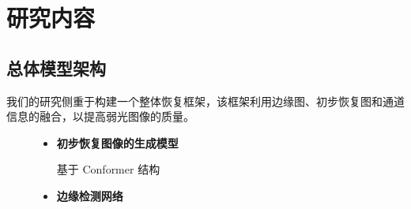 \documentclass[CJK,aspectratio=169]{beamer}  %
\begin{document}
	\section{研究内容}
	
	\subsection{总体模型架构}
	
	\begin{frame}
		
		{ \yahei 我们的研究侧重于构建一个整体恢复框架，该框架利用边缘图、初步恢复图和通道信息的融合，以提高弱光图像的质量。}
		
		
		
		\begin{figure}
			\begin{minipage}{.4\columnwidth}
				\begin{itemize}
					\item \textbf{初步恢复图像的生成模型}
					
					{ 基于 Conformer 结构}
					
					
					
					\item \textbf{边缘检测网络}
					

\end{itemize}
\end{minipage}
\end{figure}
\end{frame}
\end{document}
